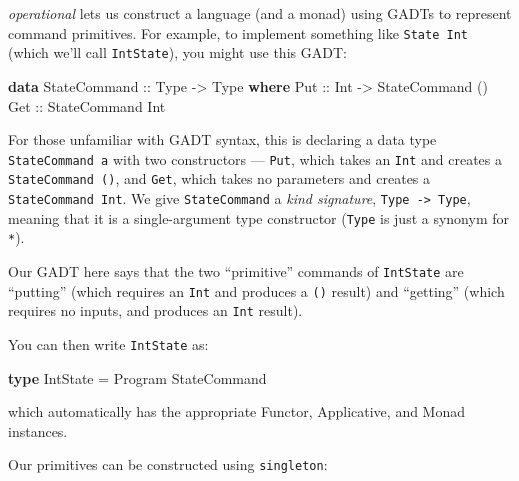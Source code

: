 \documentclass[]{article}
\newenvironment{Shaded}{}{}
\newcommand{\DataTypeTok}[1]{\textcolor[rgb]{0.56,0.13,0.00}{#1}}
\newcommand{\FunctionTok}[1]{\textcolor[rgb]{0.02,0.16,0.49}{#1}}
\newcommand{\KeywordTok}[1]{\textcolor[rgb]{0.00,0.44,0.13}{\textbf{#1}}}
\newcommand{\NormalTok}[1]{#1}
\newcommand{\OtherTok}[1]{\textcolor[rgb]{0.00,0.44,0.13}{#1}}
\begin{document}
\emph{operational} lets us construct a language (and a monad) using GADTs to
represent command primitives. For example, to implement something like
\texttt{State\ Int} (which we'll call \texttt{IntState}), you might use this
GADT:

\begin{Shaded}
\begin{Highlighting}[]
\KeywordTok{data} \DataTypeTok{StateCommand}\OtherTok{ ::} \DataTypeTok{Type} \OtherTok{->} \DataTypeTok{Type} \KeywordTok{where}
    \DataTypeTok{Put}\OtherTok{ ::} \DataTypeTok{Int} \OtherTok{->} \DataTypeTok{StateCommand}\NormalTok{ ()}
    \DataTypeTok{Get}\OtherTok{ ::} \DataTypeTok{StateCommand} \DataTypeTok{Int}
\end{Highlighting}
\end{Shaded}

For those unfamiliar with GADT syntax, this is declaring a data type
\texttt{StateCommand\ a} with two constructors --- \texttt{Put}, which takes an
\texttt{Int} and creates a \texttt{StateCommand\ ()}, and \texttt{Get}, which
takes no parameters and creates a \texttt{StateCommand\ Int}. We give
\texttt{StateCommand} a \emph{kind signature},
\texttt{Type\ -\textgreater{}\ Type}, meaning that it is a single-argument type
constructor (\texttt{Type} is just a synonym for \texttt{*}).

Our GADT here says that the two ``primitive'' commands of \texttt{IntState} are
``putting'' (which requires an \texttt{Int} and produces a \texttt{()} result)
and ``getting'' (which requires no inputs, and produces an \texttt{Int} result).

You can then write \texttt{IntState} as:

\begin{Shaded}
\begin{Highlighting}[]
\KeywordTok{type} \DataTypeTok{IntState} \FunctionTok{=} \DataTypeTok{Program} \DataTypeTok{StateCommand}
\end{Highlighting}
\end{Shaded}

which automatically has the appropriate Functor, Applicative, and Monad
instances.

Our primitives can be constructed using \texttt{singleton}:
\end{document}
